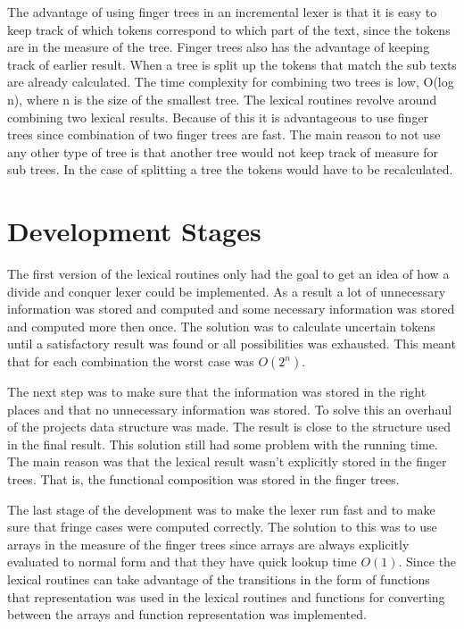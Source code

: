 The advantage of using finger trees in an incremental lexer is that it is easy
to keep track of which tokens correspond to which part of the text, since the
tokens are in the measure of the tree. Finger trees
also has the advantage of keeping track of earlier result. When a tree is split
up the tokens that match the sub texts are already calculated. The time
complexity for combining two trees is low, O(log n), where n is the size of the
smallest tree. The lexical routines revolve around combining two lexical
results. Because of this it is advantageous to use finger trees since combination
of two finger trees are fast. The main reason to not use any other type of tree
is that another tree would not keep track of measure for sub trees. In the case
of splitting a tree the tokens would have to be recalculated.

\section{Development Stages}
The first version of the lexical routines only had the goal to get an idea of
how a divide and conquer lexer could be implemented. As a result a lot of
unnecessary information was stored and computed and some necessary information
was stored and computed more then once. The solution was to calculate
uncertain tokens until a satisfactory result was found or all possibilities was
exhausted. This meant that for each combination the worst case was $O(2^n)$.

The next step was to make sure that the information was stored in the right
places and that no unnecessary information was stored. To solve this an overhaul
of the projects data structure was made. The result is close to the structure
used in the final result. This solution still had some problem with the running
time. The main reason was that the lexical result wasn't explicitly stored in
the finger trees. That is, the functional composition was stored in the finger
trees.

The last stage of the development was to make the lexer run fast and to make
sure that fringe cases were computed correctly. The solution to this was to use
arrays in the measure of the finger trees since arrays are always explicitly
evaluated to normal form and that they have quick lookup time $O(1)$. Since the
lexical routines can take advantage of the transitions in the form of functions
that representation was used in the lexical routines and functions for
converting between the arrays and function representation was implemented.

